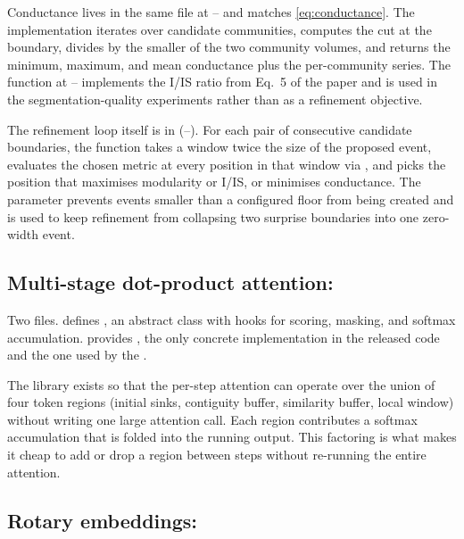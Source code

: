 Conductance lives in the same file at -- and matches \cref{eq:conductance}. The implementation iterates over candidate communities, computes the cut at the boundary, divides by the smaller of the two community volumes, and returns the minimum, maximum, and mean conductance plus the per-community series. The  function at -- implements the I/IS ratio from Eq.\ 5 of the paper and is used in the segmentation-quality experiments rather than as a refinement objective.

The refinement loop itself is in  (--). For each pair of consecutive candidate boundaries, the function takes a window twice the size of the proposed event, evaluates the chosen metric at every position in that window via , and picks the position that maximises modularity or I/IS, or minimises conductance. The  parameter prevents events smaller than a configured floor from being created and is used to keep refinement from collapsing two surprise boundaries into one zero-width event.

\subsection{Multi-stage dot-product attention: }
\label{sec:walkthrough-dpa}

Two files.  defines , an abstract class with hooks for scoring, masking, and softmax accumulation.  provides , the only concrete implementation in the released code and the one used by the .

The library exists so that the per-step attention can operate over the union of four token regions (initial sinks, contiguity buffer, similarity buffer, local window) without writing one large attention call. Each region contributes a softmax accumulation that is folded into the running output. This factoring is what makes it cheap to add or drop a region between steps without re-running the entire attention.

\subsection{Rotary embeddings: }
\label{sec:walkthrough-rope}

